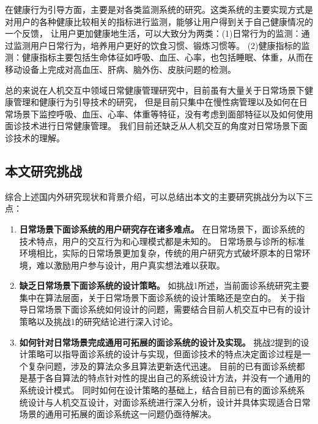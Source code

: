 在健康行为引导方面，主要是对各类监测系统的研究。这类系统的主要实现方式是对用户的各种健康比较相关的指标进行监测，能够让用户得到关于自己健康情况的一个反馈，
让用户更加健康地生活，可以大致分为两类：(1)日常行为的监测：通过监测用户日常行为，培养用户更好的饮食习惯、锻炼习惯等\cite{purpura2011fit4life, Inagawa2013A,bravata2007using,cordeiro2015barriers,lin2006fish, miller2014stepstream}。
(2)健康指标的监测：健康指标主要包括生命体征如呼吸、血压、心率，也包括睡眠、体重，从而在移动设备上完成对高血压、肝病、脑外伤、皮肤问题的检测\cite{liang2020oralcam, wang2018seismo, mariakakis2017biliscreen}。

总的来说在人机交互中领域日常健康管理研究中，目前虽有大量关于日常场景下健康管理和健康行为引导技术的研究，
但是目前只集中在慢性病管理以及如何在日常场景下监控呼吸、血压、心率、体重等特征，没有考虑到面部特征以及如何使用面诊技术进行日常健康管理。
我们目前还缺乏从人机交互的角度对日常场景下面诊技术的理解。



\subsection{本文研究挑战}
综合上述国内外研究现状和背景介绍，可以总结出本文的主要研究挑战分为以下三点：
\begin{enumerate}
    \item \textbf{日常场景下面诊系统的用户研究存在诸多难点。}
    在日常场景下，面诊系统的技术特点，用户的交互行为和心理模式都是未知的。
    日常场景与诊所的标准环境相比，实际的日常场景更加复杂，传统的用户研究方式破坏原本的日常环境，难以激励用户参与设计，用户真实想法难以获取。

\item \textbf{缺乏日常场景下面诊系统的设计策略。}
    如挑战1所述，当前面诊系统研究主要集中在算法层面，关于日常场景下面诊系统的设计策略还是空白的。
    关于指导日常场景下面诊系统如何设计的问题，需要结合目前人机交互中已有的设计策略以及挑战1的研究结论进行深入讨论。

\item \textbf{如何针对日常场景完成通用可拓展的面诊系统的设计及实现。}
    挑战2提到的设计策略可以指导面诊系统的设计与实现，但面诊技术的特点决定面诊过程是一个复杂问题，涉及的算法众多且算法更新迭代迅速。
    目前的已有面诊系统都是基于各自算法的特点针对性的提出自己的系统设计方法，并没有一个通用的系统设计模式。
    同时如何在设计策略的基础上，结合目前已有的面诊系统系统设计与人机交互设计，对面诊系统进行深入分析，设计并具体实现适合日常场景的通用可拓展的面诊系统这一问题仍亟待解决。
    
\end{enumerate}
